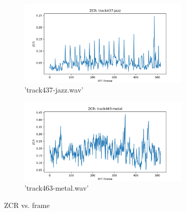 \documentclass[11pt,a4paper]{article}
\begin{document}
\begin{figure}[tb]\ContinuedFloat
	\begin{subfigure}[t]{\hsize}
		\centering
		\includegraphics[width=0.9\textwidth]{zcr_track437-jazz}
		\caption{'track437-jazz.wav'}
		\label{fig:zcr_jazz}
	\end{subfigure}
	\begin{subfigure}[t]{\hsize}
		\centering
		\includegraphics[width=0.9\textwidth]{zcr_track463-metal}
		\caption{'track463-metal.wav'}
		\label{fig:zcr_metal}
	\end{subfigure}
	\caption{ZCR vs. frame}
\end{figure}
\clearpage
\end{document}
